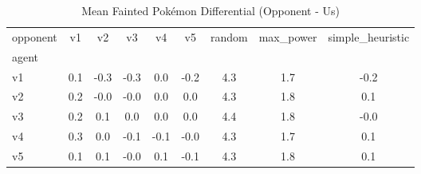 \begin{table}[htbp]
\caption{Mean Fainted Pokémon Differential (Opponent - Us)}
\label{tab:doubles_fainted_diff}
\begin{tabular}{lcccccccc}
\hline
opponent & v1 & v2 & v3 & v4 & v5 & random & max_power & simple_heuristic \\
agent &  &  &  &  &  &  &  &  \\
\hline
v1 & 0.1 & -0.3 & -0.3 & 0.0 & -0.2 & 4.3 & 1.7 & -0.2 \\
v2 & 0.2 & -0.0 & -0.0 & 0.0 & 0.0 & 4.3 & 1.8 & 0.1 \\
v3 & 0.2 & 0.1 & 0.0 & 0.0 & 0.0 & 4.4 & 1.8 & -0.0 \\
v4 & 0.3 & 0.0 & -0.1 & -0.1 & -0.0 & 4.3 & 1.7 & 0.1 \\
v5 & 0.1 & 0.1 & -0.0 & 0.1 & -0.1 & 4.3 & 1.8 & 0.1 \\
\hline
\end{tabular}
\end{table}
